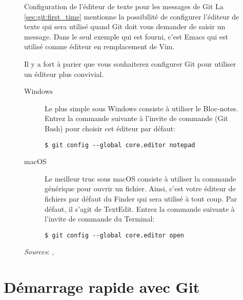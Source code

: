\begin{figure}[t]
  \begin{emphbox}{\mdseries Configuration de l'éditeur de texte pour
      les messages de Git}
    La \autoref{sec:git:first_time} mentionne la possibilité de
    configurer l'éditeur de texte qui sera utilisé quand Git doit vous
    demander de saisir un message. Dans le seul exemple qui est
    fourni, c'est Emacs qui est utilisé comme éditeur en remplacement
    de Vim.

    Il y a fort à parier que vous souhaiterez configurer Git pour
    utiliser un éditeur plus convivial.

    \begin{description}
    \item[Windows]
    Le plus simple sous Windows consiste à utiliser le Bloc-notes.
    Entrez la commande suivante à l'invite de commande (Git Bash) pour
    choisir cet éditeur par défaut:
    \begin{Schunk}
\begin{Verbatim}
$ git config --global core.editor notepad
\end{Verbatim}
    \end{Schunk}%

    \item[macOS]
    Le meilleur truc sous macOS consiste à utiliser la commande
    générique  pour ouvrir un fichier. Ainsi, c'est votre
    éditeur de fichiers par défaut du Finder qui sera utilisé à tout
    coup. Par défaut, il s'agit de TextEdit. Entrez la commande
    suivante à l'invite de commande du Terminal:
    \begin{Schunk}
\begin{Verbatim}
$ git config --global core.editor open
\end{Verbatim}
    \end{Schunk}
  \end{description}

    \emph{Sources}:
    ,
  \end{emphbox}
  \label{fig:git:editeur}
\end{figure}


\section{Démarrage rapide avec Git}
\label{sec:git:getting_started}

